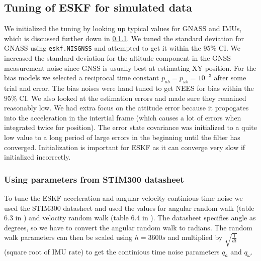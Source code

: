 \subsection{Tuning of ESKF for simulated data}
We initialized the tuning by looking up typical values for GNASS and IMUs, which is discussed further down in \cref{sec:using_datasheet}. We tuned the standard deviation for GNASS using \texttt{eskf.NISGNSS} and attempted to get it within the $95\%$ CI. We increased the standard deviation for the altitude component in the GNSS measurement noise since GNSS is usually best at estimating XY position. For the bias models we selected a reciprocal time constant $p_{ab} = p_{\omega b} = 10^{-3}$ after some trial and error. The bias noises were hand tuned to get NEES for bias within the $95\%$ CI. We also looked at the estimation errors and made sure they remained reasonably low. We had extra focus on the attitude error because it propogates into the acceleration in the intertial frame (which causes a lot of errors when integrated twice for position). The error state covariance was initialized to a quite low value to a long period of large errors in the beginning until the filter has converged. Initialization is important for ESKF as it can  converge very slow if initialized incorrectly.

\subsubsection{Using parameters from STIM300 datasheet}\label{sec:using_datasheet}
To tune the ESKF acceleration and angular velocity continious time noise we used the STIM300 datasheet \cite{stim300} and used the values for angular random walk (table 6.3 in \cite{stim300}) and velocity random walk (table 6.4 in \cite{stim300}). 
The datasheet specifies angle as degrees, so we have to convert the angular random walk to radians.
The random walk parameters can then be scaled using $h=3600s$ and multiplied by $\sqrt{\frac{1}{dt}}$ (square root of IMU rate) to get the continious time noise parameters $q_a$ and $q_\omega$.


